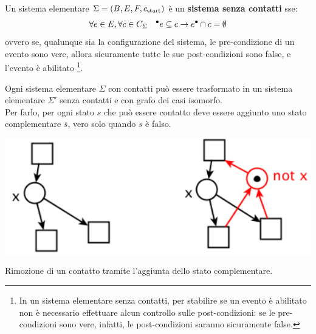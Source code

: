 \begin{defn}
    Un sistema elementare $\Sigma = (B, E, F, c_{\textnormal{start}})$ è un
    \textbf{sistema senza contatti} sse:
    \[
        \forall e \in E, \forall c \in C_{\Sigma} \quad
        {^\bullet}e \subseteq c \rightarrow e^\bullet \cap c = \emptyset
    \]
    ovvero se, qualunque sia la configurazione del sistema, le pre-condizione
    di un evento sono vere, allora sicuramente tutte le sue post-condizioni
    sono false, e l'evento è abilitato \footnote{In un sistema elementare
    senza contatti, per stabilire se un evento è abilitato non è necessario
    effettuare alcun controllo sulle post-condizioni: se le pre-condizioni
    sono vere, infatti, le post-condizioni saranno sicuramente false.}.
\end{defn}

\begin{rem}
    Ogni sistema elementare $\Sigma$ con contatti può essere trasformato in un
    sistema elementare $\Sigma'$ senza contatti e con grafo dei casi isomorfo.\\
    Per farlo, per ogni stato $s$ che può essere contatto deve essere aggiunto
    uno stato complementare $\overline{s}$, vero solo quando $s$ è falso.
\end{rem}

\begin{marginfigure}[-10cm]
    \includegraphics[width=1\linewidth]{img/contatto_complementare.png}
    \caption{Rimozione di un contatto tramite l'aggiunta dello stato complementare.}
    \label{fig:sistema_con_contatti}
\end{marginfigure}

